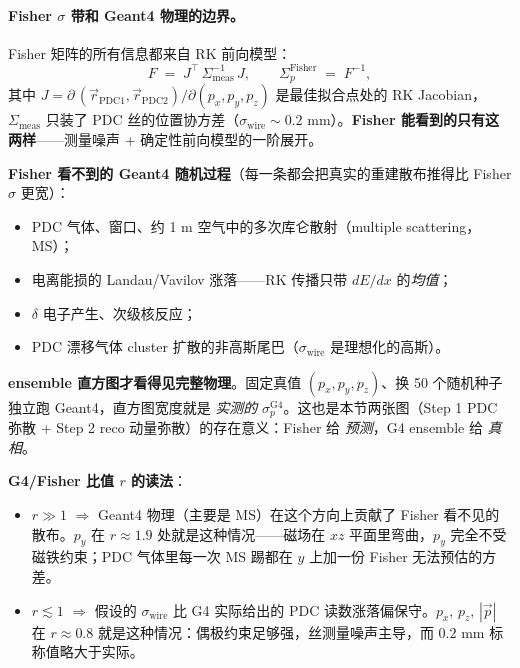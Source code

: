 \documentclass[a4paper, 11pt]{article}
\begin{document}
\paragraph{Fisher $\sigma$ 带和 Geant4 物理的边界。}
Fisher 矩阵的所有信息都来自 RK 前向模型：
\[
F \;=\; J^{\!\top}\,\Sigma_\mathrm{meas}^{-1}\,J,
\qquad
\Sigma_p^\mathrm{Fisher} \;=\; F^{-1},
\]
其中 $J = \partial\,(\vec r_\mathrm{PDC1},\vec r_\mathrm{PDC2})/\partial(p_x,p_y,p_z)$ 是最佳拟合点处的 RK Jacobian，$\Sigma_\mathrm{meas}$ 只装了 PDC 丝的位置协方差（$\sigma_\mathrm{wire}\!\sim\!0.2$ mm）。\textbf{Fisher 能看到的只有这两样}——测量噪声 + 确定性前向模型的一阶展开。

\vspace{0.05cm}
\textbf{Fisher 看不到的 Geant4 随机过程}（每一条都会把真实的重建散布推得比 Fisher $\sigma$ 更宽）：
\begin{itemize}\itemsep0pt
  \item PDC 气体、窗口、约 1 m 空气中的多次库仑散射（multiple scattering，MS）；
  \item 电离能损的 Landau/Vavilov 涨落——RK 传播只带 $dE/dx$ 的\emph{均值}；
  \item $\delta$ 电子产生、次级核反应；
  \item PDC 漂移气体 cluster 扩散的非高斯尾巴（$\sigma_\mathrm{wire}$ 是理想化的高斯）。
\end{itemize}

\vspace{0.05cm}
\textbf{ensemble 直方图才看得见完整物理}。固定真值 $(p_x,p_y,p_z)$、换 50 个随机种子独立跑 Geant4，直方图宽度就是 \emph{实测的} $\sigma_p^\mathrm{G4}$。这也是本节两张图（Step 1 PDC 弥散 + Step 2 reco 动量弥散）的存在意义：Fisher 给 \emph{预测}，G4 ensemble 给 \emph{真相}。

\vspace{0.05cm}
\textbf{G4/Fisher 比值 $r$ 的读法}：
\begin{itemize}\itemsep0pt
  \item $r \gg 1$ $\Rightarrow$ Geant4 物理（主要是 MS）在这个方向上贡献了 Fisher 看不见的散布。$p_y$ 在 $r\!\approx\!1.9$ 处就是这种情况——磁场在 $xz$ 平面里弯曲，$p_y$ 完全不受磁铁约束；PDC 气体里每一次 MS 踢都在 $y$ 上加一份 Fisher 无法预估的方差。
  \item $r \lesssim 1$ $\Rightarrow$ 假设的 $\sigma_\mathrm{wire}$ 比 G4 实际给出的 PDC 读数涨落偏保守。$p_x,\,p_z,\,|\vec p|$ 在 $r\!\approx\!0.8$ 就是这种情况：偶极约束足够强，丝测量噪声主导，而 $0.2$ mm 标称值略大于实际。
\end{itemize}
\end{document}
